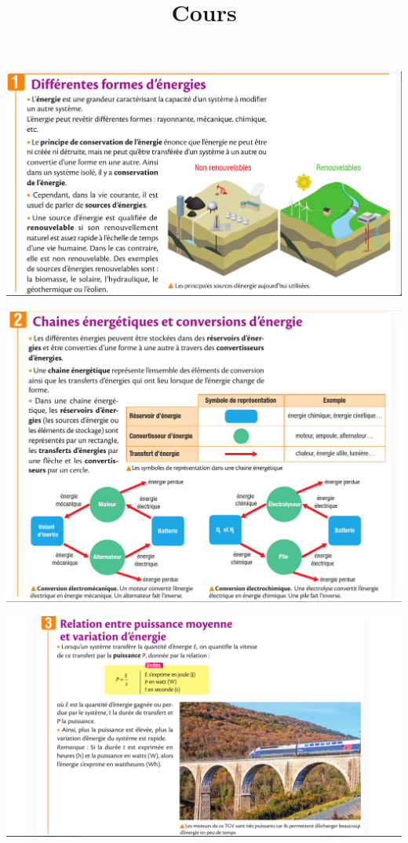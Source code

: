 \documentclass[10pt]{article}
\newcommand{\titreActivite}{Cours} %
\begin{document}
\date{}
\title{\titreActivite}
\maketitle %

\begin{center}
	\includegraphics[scale=0.32]{1.png}
\end{center}
\vspace{-10pt}

\begin{center}
	\includegraphics[scale=0.38]{2.png}
\end{center}

\vspace{-20pt}

\begin{center}
	\includegraphics[scale=0.38]{3.png}
\end{center}
\end{document}

